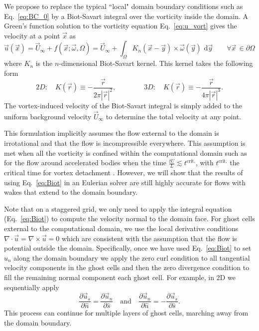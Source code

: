 \documentclass[final,1p,times]{elsarticle}
\begin{document}
We propose to replace the typical ``local" domain boundary conditions such as Eq.~\ref{eq:BC_0} by a Biot-Savart integral over the vorticity inside the domain. A Green's function solution to the vorticity equation Eq.~\ref{eq:u_vort} gives the velocity at a point $\vec x$ as
\begin{equation}\label{eq:Biot}
    {\vec u}({\vec x}) = \vec U_\infty+f(\vec x; \vec\omega,\Omega) = \vec U_\infty+\int_\Omega K_{n}({\vec x} - \vec{y})\times \vec\omega({\vec y})\text{ d}\vec{y} \quad\quad \forall \vec x\, \in \partial\Omega
\end{equation}
where $K_n$ is the $n$-dimensional Biot-Savart kernel. This kernel takes the following form \cite{Eldredge2019MathematicalFlows}
\begin{equation}\label{eq:kernels}
    2D:\quad K(\vec r)\equiv -\frac{\vec{r}}{2\pi|\vec{r}|^2}, \qquad\qquad 3D:\quad K(\vec r)\equiv -\frac{\vec{r}}{4\pi|\vec{r}|^3}.
\end{equation}
The vortex-induced velocity of the Biot-Savart integral is simply added to the uniform background velocity $\vec U_\infty$ to determine the total velocity at any point.

This formulation implicitly assumes the flow external to the domain is irrotational and that the flow is incompressible everywhere. This assumption is met when all the vorticity is confined within the computational domain such as for the flow around accelerated bodies when the time $\frac{tU}{L}\lesssim t^{\text{crit.}}$, with $t^{\text{crit.}}$ the critical time for vortex detachment \cite{Shusser2000EnergyRing}. However, we will show that the results of using Eq.~\ref{eq:Biot} in an Eulerian solver are still highly accurate for flows with wakes that extend to the domain boundary. 

Note that on a staggered grid, we only need to apply the integral equation (Eq.~\ref{eq:Biot}) to compute the velocity normal to the domain face. For ghost cells external to the computational domain, we use the local derivative conditions $\nabla\cdot\vec{u} = \nabla\times\vec{u}=0$ which are consistent with the assumption that the flow is potential outside the domain. Specifically, once we have used Eq.~\ref{eq:Biot} to set $u_n$ along the domain boundary we apply the zero curl condition to all tangential velocity components in the ghost cells and then the zero divergence condition to fill the remaining normal component each ghost cell. For example, in 2D we sequentially apply
\[ \frac{\partial \vec{u}_s}{\partial \hat{n}} = \frac{\partial \vec{u}_n}{\partial \hat{s}} \quad \text{and} \quad \frac{\partial \vec{u}_n}{\partial \hat{n}} = -\frac{\partial \vec{u}_s}{\partial \hat{s}}.\]
This process can continue for multiple layers of ghost cells, marching away from the domain boundary.
\end{document}
